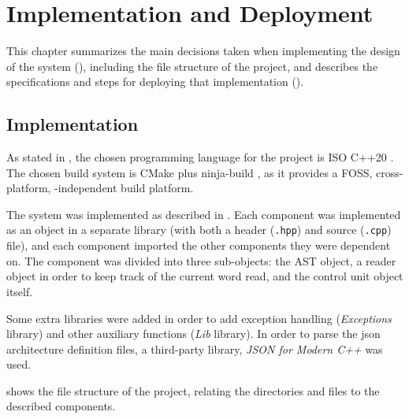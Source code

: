 \chapter{Implementation and Deployment}\label{chap:implementation}
This chapter summarizes the main decisions taken when implementing the design of the system (), including the file structure of the project, and describes the specifications and steps for deploying that implementation ().


\section{Implementation}\label{sec:implementation}
As stated in , the chosen \gls{programming language} for the project is ISO C++20 \parencite{ISOcpp20}. The chosen \gls{build system} is CMake \parencite{cmake} plus ninja-build \parencite{ninja}, as it provides a \gls{FOSS}, cross-platform, -independent build platform.

The system was implemented as described in . Each component was implemented as an object in a separate library (with both a header (\texttt{.hpp}) and source (\texttt{.cpp}) file), and each component imported the other components they were dependent on. The  component was divided into three sub-objects: the \gls{AST} object, a reader object in order to keep track of the current word read, and the control unit object itself.

Some extra libraries were added in order to add exception handling (\textit{Exceptions} library) and other auxiliary functions (\textit{Lib} library). In order to parse the \gls{json} architecture definition files, a third-party library, \textit{JSON for Modern C++} \parencite{nlohmann/json} was used.

 shows the file structure of the project, relating the directories and files to the described components.

